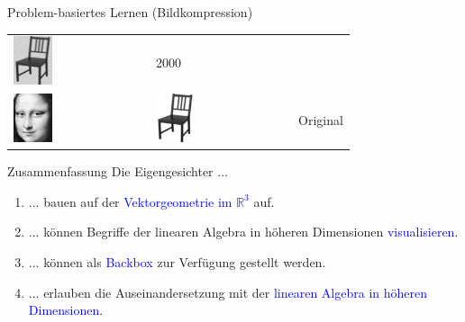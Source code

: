 \documentclass[10pt,aspectratio=169]{beamer}
\begin{document}
\begin{frame}[fragile]{Problem-basiertes Lernen (Bildkompression)}
\begin{minipage}{0.3\textwidth}
\begin{tabular}{m{1.0cm} m{1.0cm} c}
			\includegraphics[width=0.3\textwidth]{images/compression/chair_2000} & 2000 \pause \\ \includegraphics[width=0.3\textwidth]{images/compression/mona_lisa} &
			\includegraphics[width=0.3\textwidth]{images/compression/chair} & Original
		\end{tabular}
	\end{minipage}
\end{frame}

\begin{frame}[fragile]{Zusammenfassung}
	Die Eigengesichter ...\\
	\vspace{0.5cm} \pause
	\begin{enumerate}[1.] \setlength\itemsep{0.5cm}
		\item ... bauen auf der \textcolor{blue}{Vektorgeometrie im $\mathbb R^3$} auf. \pause
		\item ... können Begriffe der linearen Algebra in höheren Dimensionen \textcolor{blue}{visualisieren}. \pause
		\item ... können als \textcolor{blue}{Backbox} zur Verfügung gestellt werden. \pause
		\item ... erlauben die Auseinandersetzung mit der \textcolor{blue}{linearen Algebra in höheren Dimensionen}.
	\end{enumerate}
\end{frame}
\end{document}
